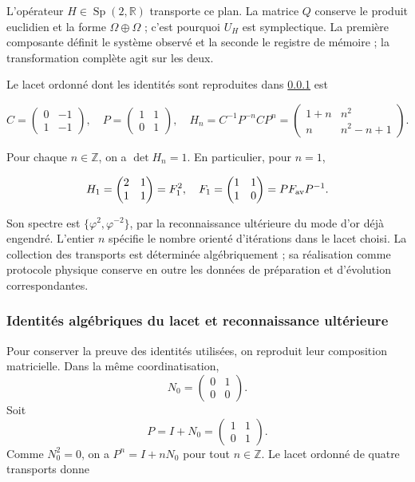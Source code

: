 L’opérateur \(H\in\operatorname{Sp}(2,\mathbb R)\) transporte ce plan. La matrice \(Q\) conserve le produit euclidien et la forme \(\Omega\oplus\Omega\) ; c’est pourquoi \(U_H\) est symplectique. La première composante définit le système observé et la seconde le registre de mémoire ; la transformation complète agit sur les deux.

Le lacet ordonné dont les identités sont reproduites dans
\ref{md:antmem:lazo-ep} est

\begin{equation}
C=\begin{pmatrix}0&-1\\1&-1\end{pmatrix},\quad
P=\begin{pmatrix}1&1\\0&1\end{pmatrix},\quad
H_n=C^{-1}P^{-n}CP^n
=\begin{pmatrix}1+n&n^2\\n&n^2-n+1\end{pmatrix}.
\label{md:antmem:cuantica:eq:5.2}
\end{equation}

Pour chaque \(n\in\mathbb Z\), on a \(\det H_n=1\). En particulier, pour \(n=1\),

\begin{equation}
H_1=\begin{pmatrix}2&1\\1&1\end{pmatrix}
=F_1^2,\quad F_1=\begin{pmatrix}1&1\\1&0\end{pmatrix}
=P F_{\rm av}P^{-1}.
\label{md:antmem:cuantica:eq:5.3}
\end{equation}

Son spectre est \(\{\varphi^2,\varphi^{-2}\}\), par la reconnaissance ultérieure du mode d’or déjà engendré. L’entier \(n\) spécifie le nombre orienté d’itérations dans le lacet choisi. La collection des transports est déterminée algébriquement ; sa réalisation comme protocole physique conserve en outre les données de préparation et d’évolution correspondantes.

\subsubsection{Identités algébriques du lacet et reconnaissance ultérieure}
\label{md:antmem:lazo-ep}
Pour conserver la preuve des identités utilisées, on reproduit
leur composition matricielle. Dans la même coordinatisation,
\[
 N_0=\begin{pmatrix}0&1\\0&0\end{pmatrix}.
\]
Soit
\[
 P=I+N_0=\begin{pmatrix}1&1\\0&1\end{pmatrix}.
\]
Comme \(N_0^2=0\), on a \(P^n=I+nN_0\) pour tout
\(n\in\mathbb Z\).
Le lacet ordonné de quatre transports donne

